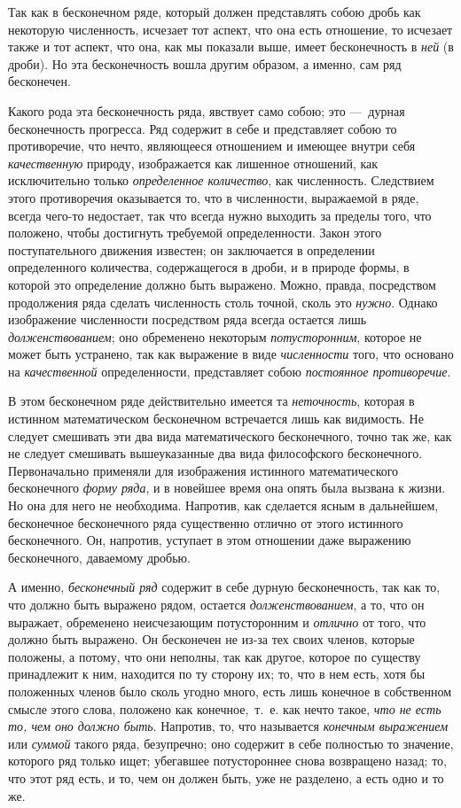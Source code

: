 {Так как в бесконечном ряде, который должен представлять собою дробь как
некоторую численность, исчезает тот аспект, что она есть отношение, то
исчезает также и тот аспект, что она, как мы показали выше, имеет
бесконечность в {\em ней} (в дроби). Но эта
бесконечность вошла другим образом, а именно, сам ряд бесконечен.

Какого рода эта бесконечность ряда, явствует само собою; это —~дурная
бесконечность прогресса. Ряд содержит в себе и представляет собою то
противоречие, что нечто, являющееся отношением и имеющее внутри себя
{\em качественную} природу, изображается как лишенное
отношений, как исключительно только {\em определенное
количество}, как численность. Следствием этого противоречия оказывается то,
что в численности, выражаемой в ряде, всегда чего-то недостает, так что
всегда нужно выходить за пределы того, что положено, чтобы достигнуть
требуемой определенности. Закон этого поступательного движения известен; он
заключается в определении определенного количества, содержащегося в дроби,
и в природе формы, в которой это определение должно быть выражено. Можно,
правда, посредством продолжения ряда сделать численность столь точной,
сколь это {\em нужно}. Однако изображение численности
посредством ряда всегда остается лишь
{\em долженствованием}; оно обременено некоторым
{\em потусторонним}, которое не может быть устранено,
так как выражение в виде {\em численности} того, что
основано на {\em качественной} определенности,
представляет собою {\em постоянное противоречие}.

В этом бесконечном ряде действительно имеется та
{\em неточность}, которая в истинном математическом
бесконечном встречается лишь как видимость. Не следует смешивать эти два
вида математического бесконечного, точно так же, как не следует смешивать
вышеуказанные два вида философского бесконечного. Первоначально применяли
для изображения истинного математического бесконечного
{\em форму ряда}, и в новейшее время она опять была
вызвана к жизни. Но она для него не необходима. Напротив, как сделается
ясным в дальнейшем, бесконечное бесконечного ряда существенно отлично от
этого истинного бесконечного. Он, напротив, уступает в этом отношении даже
выражению бесконечного, даваемому дробью.

А именно, {\em бесконечный ряд} содержит в себе дурную
бесконечность, так как то, что должно быть выражено рядом, остается
{\em долженствованием}, а то, что он выражает,
обременено неисчезающим потусторонним и {\em отлично}
от того, что должно быть выражено. Он бесконечен не из-за тех своих членов,
которые положены, а потому, что они неполны, так как другое, которое по
существу принадлежит к ним, находится по ту сторону их; то, что в нем есть,
хотя бы положенных членов было сколь угодно много, есть лишь конечное в
собственном смысле этого слова, положено как конечное,~т.~е. как нечто
такое, {\em что не есть то, чем оно должно быть}.
Напротив, то, что называется {\em конечным выражением}
или {\em суммой} такого ряда, безупречно; оно содержит
в себе полностью то значение, которого ряд только ищет; убегавшее
потустороннее снова возвращено назад; то, что этот ряд есть, и то, чем он
должен быть, уже не разделено, а есть одно и то же.

}
